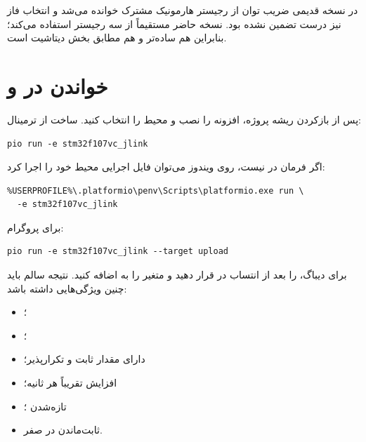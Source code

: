 در نسخه قدیمی ضریب توان از رجیستر هارمونیک مشترک
خوانده می‌شد و انتخاب فاز نیز درست تضمین نشده بود. نسخه حاضر مستقیماً از سه رجیستر
استفاده می‌کند؛ بنابراین هم ساده‌تر و هم مطابق بخش  دیتاشیت است.

\section{خواندن در  و }
پس از بازکردن ریشه پروژه، افزونه
را نصب و محیط
را انتخاب کنید. ساخت از ترمینال:

\begin{LTR}
\begin{verbatim}
pio run -e stm32f107vc_jlink
\end{verbatim}
\end{LTR}

اگر فرمان
در  نیست، روی ویندوز می‌توان فایل اجرایی محیط خود  را اجرا کرد:

\begin{LTR}
\begin{verbatim}
%USERPROFILE%\.platformio\penv\Scripts\platformio.exe run \
  -e stm32f107vc_jlink
\end{verbatim}
\end{LTR}

برای پروگرام:

\begin{LTR}
\begin{verbatim}
pio run -e stm32f107vc_jlink --target upload
\end{verbatim}
\end{LTR}

برای دیباگ،  را بعد از انتساب
در
قرار دهید و متغیر
را به  اضافه کنید. نتیجه سالم باید چنین ویژگی‌هایی داشته باشد:

\begin{itemize}
  \item {}؛
  \item {}؛
  \item {} دارای مقدار ثابت و تکرارپذیر؛
  \item افزایش  تقریباً هر ثانیه؛
  \item تازه‌شدن ؛
  \item ثابت‌ماندن  در صفر.
\end{itemize}

